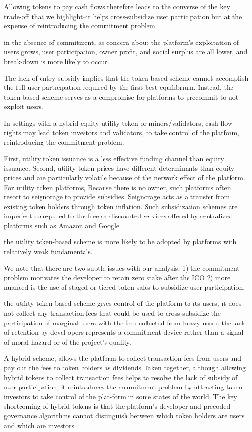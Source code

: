         Allowing tokens to pay cash flows therefore leads to the converse of the key trade-off that we highlight--it helps cross-subsidize user participation but at the expense of reintroducing the commitment problem

        in the absence of commitment, as concern about the platform's exploitation of users grows, user participation, owner profit, and social surplus are all lower, and break-down is more likely to occur.

        The lack of entry subsidy implies that the token-based scheme cannot accomplish the full user participation required by the first-best equilibrium. Instead, the token-based scheme serves as a compromise for platforms to precommit to not exploit users.

        In settings with a hybrid equity-utility token or miners/validators, cash flow rights may lead token investors and validators, to take control of the platform, reintroducing the commitment problem.

        First, utility token issuance is a less effective funding channel than equity issuance. Second, utility token prices have different determinants than equity prices and are particularly volatile because of the network effect of the platform. For utility token platforms, Because there is no owner, such platforms often resort to seignorage to provide subsidies. Seignorage acts as a transfer from existing token holders through token inflation. Such subsidization schemes are imperfect com-pared to the free or discounted services offered by centralized platforms such as Amazon and Google

        the utility token-based scheme is more likely to be adopted by platforms with relatively weak fundamentals.

        We note that there are two subtle issues with our analysis. 1) the commitment problem motivates the developer to retain zero stake after the ICO 2) more nuanced is the use of staged or tiered token sales to subsidize user participation.

        the utility token-based scheme gives control of the platform to its users, it does not collect any transaction fees that could be used to cross-subsidize the participation of marginal users with the fees collected from heavy users. the lack of retention by devel-opers represents a commitment device rather than a signal of moral hazard or of the project's quality.

        A hybrid scheme, allows the platform to collect transaction fees from users and pay out the fees to token holders as dividends Taken together, although allowing hybrid tokens to collect transaction fees helps to resolve the lack of subsidy of user participation, it reintroduces the commitment problem by attracting token investors to take control of the plat-form in some states of the world. The key shortcoming of hybrid tokens is that the platform's developer and precoded governance algorithms cannot distinguish between which token holders are users and which are investors

